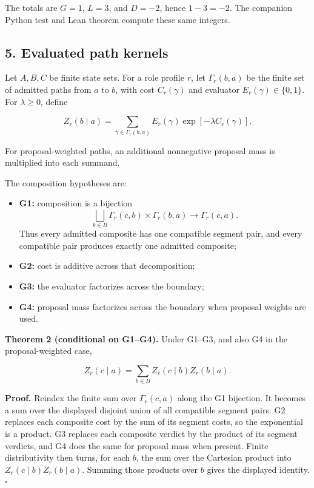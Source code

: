 \documentclass[
  11pt,
]{article}
\providecommand{\tightlist}{%
  \setlength{\itemsep}{0pt}\setlength{\parskip}{0pt}}
\theoremstyle{plain}
\theoremstyle{definition}\newtheorem{definition}[theorem]{Definition}
\theoremstyle{remark}\newtheorem*{remark}{Remark}
\begin{document}
The totals are \(G=1\), \(L=3\), and \(D=-2\), hence \(1-3=-2\). The companion
Python test and Lean theorem compute these same integers.

\subsection{5. Evaluated path kernels}\label{evaluated-path-kernels}

Let \(A,B,C\) be finite state sets. For a role profile \(r\), let
\(\Gamma_r(b,a)\) be the finite set of admitted paths from \(a\) to \(b\), with
cost \(C_r(\gamma)\) and evaluator \(E_r(\gamma)\in\{0,1\}\). For
\(\lambda\ge 0\), define

\[
Z_r(b\mid a)
=\sum_{\gamma\in\Gamma_r(b,a)}
E_r(\gamma)\exp[-\lambda C_r(\gamma)].
\]

For proposal-weighted paths, an additional nonnegative proposal mass is
multiplied into each summand.

The composition hypotheses are:

\begin{itemize}
\tightlist
\item
  \textbf{G1:} composition is a bijection
  \[
  \bigsqcup_{b\in B}\Gamma_r(c,b)\times\Gamma_r(b,a)
  \longrightarrow \Gamma_r(c,a).
  \]
  Thus every admitted composite has one compatible segment pair, and every
  compatible pair produces exactly one admitted composite;
\item
  \textbf{G2:} cost is additive across that decomposition;
\item
  \textbf{G3:} the evaluator factorizes across the boundary;
\item
  \textbf{G4:} proposal mass factorizes across the boundary when proposal weights
  are used.
\end{itemize}

\medskip

\textbf{Theorem 2 (conditional on G1--G4).} Under G1--G3, and also G4 in
the proposal-weighted case,

\[
Z_r(c\mid a)=\sum_{b\in B}Z_r(c\mid b)Z_r(b\mid a).
\]

\textbf{Proof.} Reindex the finite sum over \(\Gamma_r(c,a)\) along the G1 bijection.
It becomes a sum over the displayed disjoint union of all compatible segment
pairs. G2 replaces each composite cost by the sum of its segment costs, so the
exponential is a product. G3 replaces each composite verdict by the product
of its segment verdicts, and G4 does the same for proposal mass when present.
Finite distributivity then turns, for each \(b\), the sum over the Cartesian
product into \(Z_r(c\mid b)Z_r(b\mid a)\). Summing those products over \(b\) gives
the displayed identity. \(\square\)
\end{document}
